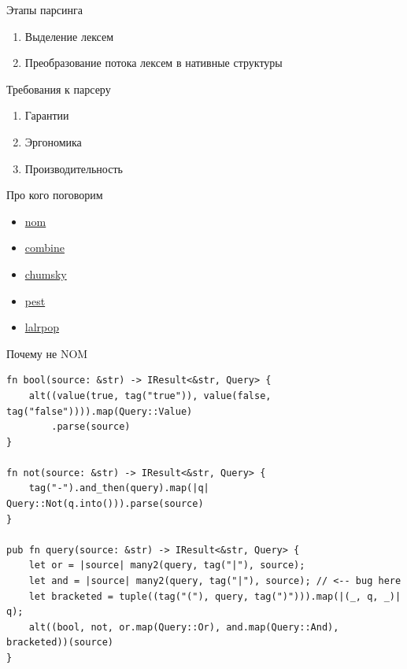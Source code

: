 \begin{frame}
    \titlepage{}
\end{frame}

\begin{frame}{Этапы парсинга}
    \begin{enumerate}
        \item Выделение лексем
        \item Преобразование потока лексем в нативные структуры
    \end{enumerate}
\end{frame}

\begin{frame}{Требования к парсеру}
    \begin{enumerate}
        \item Гарантии
        \item Эргономика
        \item Производительность
    \end{enumerate}
\end{frame}

\begin{frame}{Про кого поговорим}
    \begin{itemize}
        \item \href{https://docs.rs/nom/latest/nom/}{nom}
        \item \href{https://docs.rs/combine/latest/combine/}{combine}
        \item \href{https://docs.rs/chumsky/latest/chumsky/}{chumsky}
        \item \href{https://docs.rs/pest/latest/pest/}{pest}
        \item \href{https://github.com/lalrpop/lalrpop}{lalrpop}
    \end{itemize}
\end{frame}

\begin{frame}[fragile]{Почему не NOM}
    \begin{verbatim}
fn bool(source: &str) -> IResult<&str, Query> {
    alt((value(true, tag("true")), value(false, tag("false")))).map(Query::Value)
        .parse(source)
}

fn not(source: &str) -> IResult<&str, Query> {
    tag("-").and_then(query).map(|q| Query::Not(q.into())).parse(source)
}

pub fn query(source: &str) -> IResult<&str, Query> {
    let or = |source| many2(query, tag("|"), source);
    let and = |source| many2(query, tag("|"), source); // <-- bug here
    let bracketed = tuple((tag("("), query, tag(")"))).map(|(_, q, _)| q);
    alt((bool, not, or.map(Query::Or), and.map(Query::And), bracketed))(source)
}
    \end{verbatim}
\end{frame}

